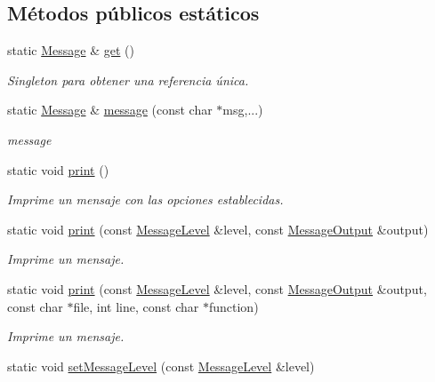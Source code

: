 \subsection*{Métodos públicos estáticos}
\begin{DoxyCompactItemize}
\item 
static \hyperlink{class_i3_d_1_1_message}{Message} \& \hyperlink{class_i3_d_1_1_message_a4e67294cda784d09467939c4a580cf18}{get} ()
\begin{DoxyCompactList}\small\item\em Singleton para obtener una referencia única. \end{DoxyCompactList}\item 
static \hyperlink{class_i3_d_1_1_message}{Message} \& \hyperlink{class_i3_d_1_1_message_a525f877a41a1e7493188b2b720d1d254}{message} (const char $\ast$msg,...)
\begin{DoxyCompactList}\small\item\em message \end{DoxyCompactList}\item 
static void \hyperlink{class_i3_d_1_1_message_a414c9296d819d4ea29cbcb8719d1af2a}{print} ()
\begin{DoxyCompactList}\small\item\em Imprime un mensaje con las opciones establecidas. \end{DoxyCompactList}\item 
static void \hyperlink{class_i3_d_1_1_message_abcbe6bb4eaedadfc2a293bc30199b154}{print} (const \hyperlink{namespace_i3_d_a1c1740d2076e09b1a37b82e45a0327b5}{Message\+Level} \&level, const \hyperlink{namespace_i3_d_a2ccb65ac6e08844c1175a235107fa103}{Message\+Output} \&output)
\begin{DoxyCompactList}\small\item\em Imprime un mensaje. \end{DoxyCompactList}\item 
static void \hyperlink{class_i3_d_1_1_message_a35685ab8b54377a7846917cf065288cf}{print} (const \hyperlink{namespace_i3_d_a1c1740d2076e09b1a37b82e45a0327b5}{Message\+Level} \&level, const \hyperlink{namespace_i3_d_a2ccb65ac6e08844c1175a235107fa103}{Message\+Output} \&output, const char $\ast$file, int line, const char $\ast$function)
\begin{DoxyCompactList}\small\item\em Imprime un mensaje. \end{DoxyCompactList}\item 
static void \hyperlink{class_i3_d_1_1_message_a05802b639ffc072d4921757a7f494fad}{set\+Message\+Level} (const \hyperlink{namespace_i3_d_a1c1740d2076e09b1a37b82e45a0327b5}{Message\+Level} \&level)

\end{DoxyCompactItemize}
